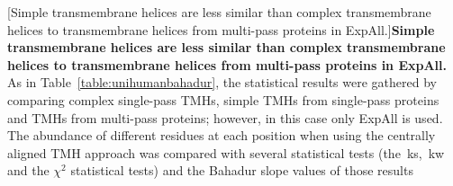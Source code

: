 \begin{table}[htbp]

  \centering
  [Simple transmembrane helices are less similar than complex transmembrane helices to transmembrane helices from multi\--pass proteins in ExpAll.]{\textbf{Simple transmembrane helices are less similar than complex transmembrane helices to transmembrane helices from multi\--pass proteins in ExpAll.}
  As in Table~\ref{table:unihumanbahadur}, the statistical results were gathered by comparing complex single\--pass TMHs, simple TMHs from single\--pass proteins and TMHs from multi\--pass proteins; however, in this case only ExpAll is used.
  The abundance of different residues at each position when using the centrally aligned TMH approach was compared with several statistical tests (the~\gls{ks},~\gls{kw} and the $\chi^2$ statistical tests) and the Bahadur slope values of those results}
\end{table}
